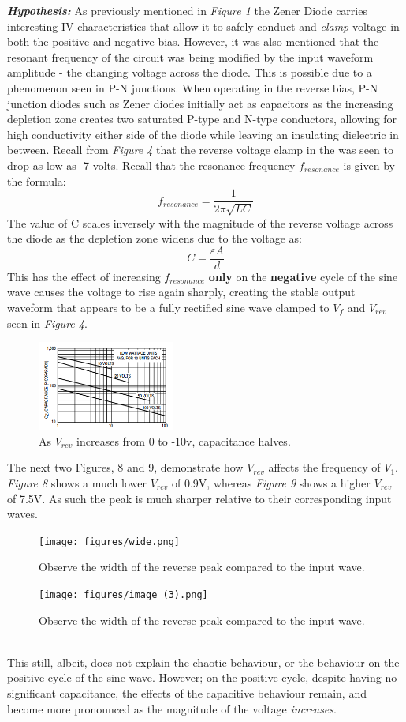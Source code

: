 \documentclass[10pt,twocolumn,letterpaper]{article}
\begin{document}
\textbf{\textit{Hypothesis:}} As previously mentioned in \textit{Figure 1} the Zener Diode carries interesting IV characteristics that allow it to safely conduct and \textit{clamp} voltage in both the positive and negative bias.  However, it was also mentioned that the resonant frequency of the circuit was being modified by the input waveform amplitude - the changing voltage across the diode.  
This is possible due to a phenomenon seen in P-N junctions.  When operating in the reverse bias, P-N junction diodes such as Zener diodes initially act as capacitors as the increasing depletion zone creates two saturated P-type and N-type conductors, allowing for high conductivity either side of the diode while leaving an insulating dielectric in between\cite{diodefact}.  Recall from \textit{Figure 4} that the reverse voltage clamp in the was seen to drop as low as -7 volts. 
Recall that the resonance frequency \(f_{resonance}\) is given by the formula:
\[f_{resonance} = \frac{1}{2\pi\sqrt{LC}}\]
The value of C scales inversely with the magnitude of the reverse voltage across the diode as the depletion zone widens due to the voltage\cite{diodefact} as:
\[C = \frac{\varepsilon A}{d}\]
This has the effect of increasing \(f_{resonance}\) \textbf{only} on the \textbf{negative} cycle of the sine wave causes the voltage to rise again sharply, creating the stable output waveform that appears to be a fully rectified sine wave clamped to \(V_f\) and \(V_{rev}\) seen in \textit{Figure 4}.
\begin{figure}[h]
  \centering
  \includegraphics[width=0.4\textwidth]{figures/revcap.png}
  \caption{As \(V_{rev}\) increases from 0 to -10v, capacitance halves\cite{revcap}.}
\end{figure}

The next two Figures, 8 and 9, demonstrate how \(V_{rev}\) affects the frequency of \(V_1\).  \textit{Figure 8} shows a much lower \(V_{rev}\) of 0.9V, whereas \textit{Figure 9} shows a higher \(V_{rev}\) of 7.5V.  As such the peak is much sharper relative to their corresponding input waves.
\begin{figure}[h]
  \centering
  \texttt{[image: figures/wide.png]}
  \caption{Observe the width of the reverse peak compared to the input wave.}
\end{figure}
\begin{figure}[h]
  \centering
  \texttt{[image: figures/image (3).png]}
  \caption{Observe the width of the reverse peak compared to the input wave.}
\end{figure}
\\
This still, albeit, does not explain the chaotic behaviour, or the behaviour on the positive cycle of the sine wave.  However; on the positive cycle, despite having no significant capacitance, the effects of the capacitive behaviour remain, and become more pronounced as the magnitude of the voltage \textit{increases}.  
\end{document}
